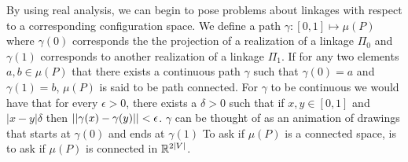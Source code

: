By using real analysis, we can begin to pose problems about linkages with respect to a corresponding configuration space.  
We define a path $\gamma: [0,1]\mapsto \mu(P)$ where $\gamma(0)$ corresponds the the projection of a realization of a linkage $\Pi_0$ and $\gamma(1)$ corresponds to another realization of a linkage $\Pi_1$.  
If for any two elements $a,b \in \mu(P)$ that there exists a continuous path $\gamma$ such that $\gamma(0)=a$ and $\gamma(1)=b$, $\mu(P)$ is said to be path connected.   
For $\gamma$ to be continuous we would have that for every $\epsilon > 0$, there exists a $\delta >0$ such that if $x,y \in [0,1]$ and $\vert x-y \vert \delta$ then $\left\vert \left\vert \gamma(x)-\gamma(y) \right\vert \right\vert<\epsilon$.
$\gamma$ can be thought of as an animation of drawings that starts at $\gamma(0)$ and ends at $\gamma(1)$
To ask if $\mu(P)$ is a connected space, is to ask if $\mu(P)$ is connected in ${\mathbb{R}}^{2\vert V \vert}$.





